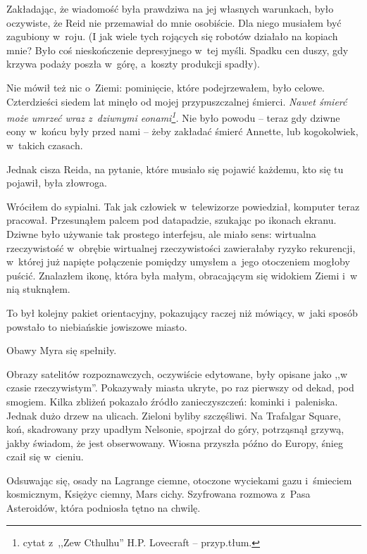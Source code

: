 \documentclass[oneside,polish,11pt,sfheadings]{mwbk}
\begin{document}
Zakładając, że wiadomość była prawdziwa na jej własnych warunkach, było
oczywiste, że Reid nie przemawiał do mnie osobiście. Dla niego musiałem
być zagubiony w~roju. (I jak wiele tych rojących się robotów działało na
kopiach mnie? Było coś nieskończenie depresyjnego w~tej myśli. Spadku
cen duszy, gdy krzywa podaży poszła w~górę, a~koszty produkcji spadły).

Nie mówił też nic o~Ziemi: pominięcie, które podejrzewałem, było celowe.
Czterdzieści siedem lat minęło od mojej przypuszczalnej śmierci. \emph{Nawet
śmierć może umrzeć wraz z~dziwnymi eonami\footnote{ cytat z~,,Zew Cthulhu''
H.P. Lovecraft -- przyp.tłum.}.} Nie było powodu -- teraz gdy dziwne eony w~końcu były przed nami -- żeby zakładać śmierć Annette, lub kogokolwiek, w~takich czasach.

Jednak cisza Reida, na pytanie, które musiało się pojawić każdemu, kto
się tu pojawił, była złowroga.

Wróciłem do sypialni. Tak jak człowiek w~telewizorze powiedział,
komputer teraz pracował. Przesunąłem palcem pod datapadzie, szukając po
ikonach ekranu. Dziwne było używanie tak prostego interfejsu, ale miało
sens: wirtualna rzeczywistość w~obrębie wirtualnej rzeczywistości
zawierałaby ryzyko rekurencji, w~której już napięte połączenie pomiędzy
umysłem a~jego otoczeniem mogłoby puścić. Znalazłem ikonę, która była
małym, obracającym się widokiem Ziemi i~w nią stuknąłem.

To był kolejny pakiet orientacyjny, pokazujący raczej niż mówiący, w~jaki sposób powstało to niebiańskie jowiszowe miasto.

Obawy Myra się spełniły.

Obrazy satelitów rozpoznawczych, oczywiście edytowane, były opisane jako
,,w czasie rzeczywistym''. Pokazywały miasta ukryte, po raz pierwszy od
dekad, pod smogiem. Kilka zbliżeń pokazało źródło zanieczyszczeń:
kominki i~paleniska. Jednak dużo drzew na ulicach. Zieloni byliby
szczęśliwi. Na Trafalgar Square, koń, skadrowany przy upadłym Nelsonie,
spojrzał do góry, potrząsnął grzywą, jakby świadom, że jest obserwowany.
Wiosna przyszła późno do Europy, śnieg czaił się w~cieniu.

Odsuwając się, osady na Lagrange ciemne, otoczone wyciekami gazu i~śmieciem kosmicznym, Księżyc ciemny, Mars cichy. Szyfrowana rozmowa z~Pasa Asteroidów, która podniosła tętno na chwilę.
\end{document}
